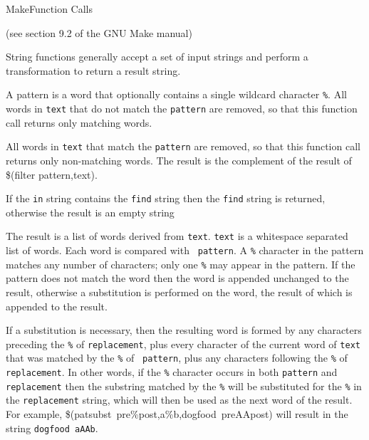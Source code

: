 \begin{manpage}{Make}{Function Calls}{}

\subtitle{String Functions}

(see section 9.2 of the GNU Make manual)

String functions generally accept a set of input strings and perform a
transformation to return a result string.

\separator
{}

A pattern is a word that optionally contains a single wildcard character
{\tt\%}.  All words in {\tt text} that do not match the {\tt pattern} are
removed, so that this function call returns only matching words.

\separator
{}

All words in {\tt text} that match the {\tt pattern} are removed, so that
this function call returns only non-matching words.  The result is the
complement of the result of \$(filter pattern,text).

\separator
{}

If the {\tt in} string contains the {\tt find} string then the {\tt find}
string is returned, otherwise the result is an empty string

\separator
{}

The result is a list of words derived from {\tt text}.  {\tt text} is a
whitespace separated list of words.  Each word is compared with {\tt
pattern}.  A {\tt\%} character in the pattern matches any number of
characters; only one {\tt\%} may appear in the pattern.  If the pattern
does not match the word then the word is appended unchanged to the result,
otherwise a substitution is performed on the word, the result of which is
appended to the result.

If a substitution is necessary, then the resulting word is formed by any
characters preceding the {\tt\%} of {\tt replacement}, plus every character
of the current word of {\tt text} that was matched by the {\tt\%} of {\tt
pattern}, plus any characters following the {\tt\%} of {\tt replacement}.
In other words, if the {\tt\%} character occurs in both {\tt pattern} and
{\tt replacement} then the substring matched by the {\tt\%} will be
substituted for the {\tt\%} in the {\tt replacement} string, which will
then be used as the next word of the result.  For example,
\$(patsubst~pre\%post,a\%b,dogfood~preAApost) will result in the string
{\tt dogfood~aAAb}.


\end{manpage}
